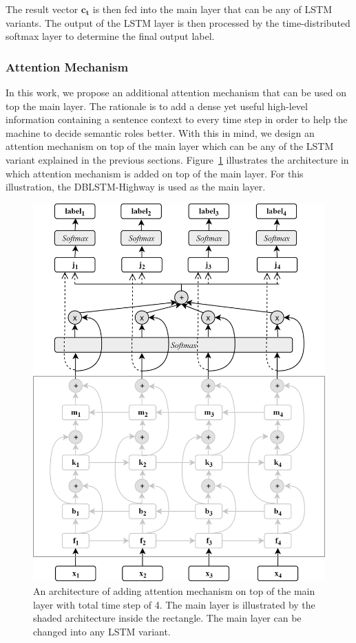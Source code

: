 The result vector $\mathbf{c_{t}}$ is then fed into the main layer that can be any of LSTM variants. The output of the LSTM layer is then processed by the time-distributed softmax layer to determine the final output label.

\subsubsection{Attention Mechanism}
In this work, we propose an additional attention mechanism that can be used on top the main layer. The rationale is to add a dense yet useful high-level information containing a sentence context to every time step in order to help the machine to decide semantic roles better. With this in mind, we design an attention mechanism on top of the main layer which can be any of the LSTM variant explained in the previous sections. Figure~\ref{fig:dblstmhighwayattention} illustrates the architecture in which attention mechanism is added on top of the main layer. For this illustration, the DBLSTM-Highway is used as the main layer.

\begin{figure}
	\centering
	\includegraphics[width=0.75\linewidth]{images/dblstmhighwayattention}
	\caption{An architecture of adding attention mechanism on top of the main layer with total time step of 4. The main layer is illustrated by the shaded architecture inside the rectangle. The main layer can be changed into any LSTM variant.}
	\label{fig:dblstmhighwayattention}
\end{figure}

